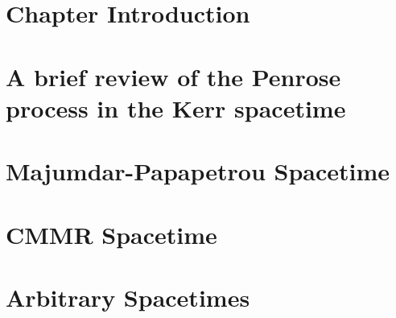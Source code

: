 \section{Chapter Introduction}
\label{ch:penrose_binaries:sec:intro}


\section{A brief review of the Penrose process in the Kerr spacetime}
\label{ch:penrose_binaries:sec:penrose_review}


\section{Majumdar-Papapetrou Spacetime}
\label{ch:penrose_binaries:sec:mp_penrose}


\section{CMMR Spacetime}
\label{ch:penrose_binaries:sec:cmmr_penrose}


\section{Arbitrary Spacetimes}
\label{ch:penrose_binaries:sec:arbitrary_penrose}

